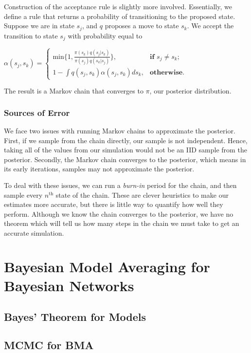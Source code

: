 \documentclass[12pt,twoside]{reedthesis}
\begin{document}
			Construction of the acceptance rule is slightly more involved. 
			Essentially, we define a rule that returns a probability of transitioning to the proposed state.
			Suppose we are in state $s_j$, and $q$ proposes a move to state $s_k$. 
			We accept the transition to state $s_j$ with probability equal to
			\begin{center}
			$ \alpha(s_j,s_k) = 
			\begin{cases} \textrm{min}\{1, \frac{\pi(s_k)q(s_j | s_k)}{\pi(s_j)q(s_k | s_j)}\}, & \textbf{if\ \ \ } s_j \neq s_k; \\
			1 - \int q(s_j,s_k)\alpha(s_j,s_k)ds_k, & \textbf{otherwise}. \end{cases}
			$
			\end{center}
			The result is a Markov chain that converges to $\pi$, our posterior distribution.
			
		\subsection*{Sources of Error}
			We face two issues with running Markov chains to approximate the posterior. First, if we sample from the chain directly, our sample is not independent. Hence, taking all of the values from our simulation would not be an IID sample from the posterior. Secondly, the Markov chain converges to the posterior, which means in its early iterations, samples may not approximate the posterior. 
			
			To deal with these issues, we can run a {\em burn-in} period for the chain, and then sample every $n^{\text{th}}$ state of the chain. These are clever heuristics to make our estimates more accurate, but there is little way to quantify how well they perform. Although we know the chain converges to the posterior, we have no theorem which will tell us how many steps in the chain we must take to get an accurate simulation.

\chapter{Bayesian Model Averaging for Bayesian Networks}

	\section{Bayes' Theorem for Models}

	\section{MCMC for BMA}
\end{document}

